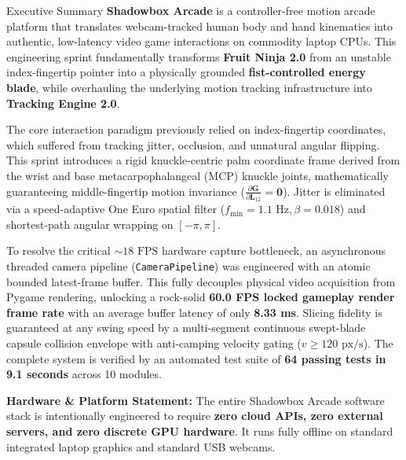 \documentclass[11pt,a4paper]{article}
\begin{document}
\begin{CalloutBox}[NavyPrimary]{Executive Summary}
\textbf{Shadowbox Arcade} is a controller-free motion arcade platform that translates webcam-tracked human body and hand kinematics into authentic, low-latency video game interactions on commodity laptop CPUs. This engineering sprint fundamentally transforms \textbf{Fruit Ninja 2.0} from an unstable index-fingertip pointer into a physically grounded \textbf{fist-controlled energy blade}, while overhauling the underlying motion tracking infrastructure into \textbf{Tracking Engine 2.0}.

The core interaction paradigm previously relied on index-fingertip coordinates, which suffered from tracking jitter, occlusion, and unnatural angular flipping. This sprint introduces a rigid knuckle-centric palm coordinate frame derived from the wrist and base metacarpophalangeal (MCP) knuckle joints, mathematically guaranteeing middle-fingertip motion invariance ($\frac{\partial \mathbf{G}}{\partial \mathbf{L}_{12}} = \mathbf{0}$). Jitter is eliminated via a speed-adaptive One Euro spatial filter ($f_{\min}=1.1\text{ Hz}, \beta=0.018$) and shortest-path angular wrapping on $[-\pi, \pi]$.

To resolve the critical $\sim 18\text{ FPS}$ hardware capture bottleneck, an asynchronous threaded camera pipeline (\texttt{CameraPipeline}) was engineered with an atomic bounded latest-frame buffer. This fully decouples physical video acquisition from Pygame rendering, unlocking a rock-solid \textbf{60.0 FPS locked gameplay render frame rate} with an average buffer latency of only \textbf{8.33 ms}. Slicing fidelity is guaranteed at any swing speed by a multi-segment continuous swept-blade capsule collision envelope with anti-camping velocity gating ($v \ge 120\text{ px/s}$). The complete system is verified by an automated test suite of \textbf{64 passing tests in 9.1 seconds} across 10 modules.
\end{CalloutBox}

\vspace{0.4em}

\begin{tcolorbox}[
  enhanced,
  colback=CardBg,
  colframe=CardBorder,
  arc=2mm,
  boxrule=0.8pt,
  left=12pt, right=12pt, top=6pt, bottom=6pt
]
\small
\textbf{\color{NavyPrimary}Hardware \& Platform Statement:} The entire Shadowbox Arcade software stack is intentionally engineered to require \textbf{zero cloud APIs, zero external servers, and zero discrete GPU hardware}. It runs fully offline on standard integrated laptop graphics and standard USB webcams.
\end{tcolorbox}
\end{document}
